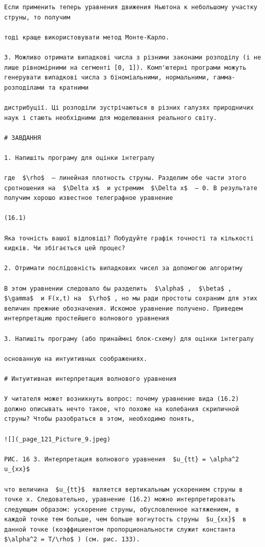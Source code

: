 \documentclass[
  ukrainian,
]{article}
\begin{document}
\begin{verbatim}
Если применить теперь уравнения движения Ньютона к небольшому участку струны, то получим

тоді краще використовувати метод Монте-Карло.

3. Можливо отримати випадкові числа з різними законами розподілу (і не лише рівномірними на сегменті [0, 1]). Комп'ютерні програми можуть генерувати випадкові числа з біноміальними, нормальними, гамма-розподілами та кратними

дистрибуції. Ці розподіли зустрічаються в різних галузях природничих наук і стають необхідними для моделювання реального світу.

# ЗАВДАННЯ

1. Напишіть програму для оцінки інтегралу

где  $\rho$  — линейная плотность струны. Разделим обе части этого сротношения на  $\Delta x$  и устремим  $\Delta x$  — 0. В результате получим хорошо известное телеграфное уравнение

(16.1)

Яка точність вашої відповіді? Побудуйте графік точності та кількості кидків. Чи збігається цей процес?

2. Отримати послідовність випадкових чисел за допомогою алгоритму

В этом уравнении следовало бы разделить  $\alpha$ ,  $\beta$ ,  $\gamma$  и F(x,t) на  $\rho$ , но мы ради простоты сохраним для этих величин прежние обозначения. Искомое уравнение получено. Приведем интерпретацию простейшего волнового уравнения

3. Напишіть програму (або принаймні блок-схему) для оцінки інтегралу

основанную на интуитивных соображениях.

# Интуитивная интерпретация волнового уравнения

У читателя может возникнуть вопрос: почему уравнение вида (16.2) должно описывать нечто такое, что похоже на колебания скрипичной струны? Чтобы разобраться в этом, необходимо понять,

![](_page_121_Picture_9.jpeg)

РИС. 16 3. Интерпретация волнового уравнения  $u_{tt} = \alpha^2 u_{xx}$ 

что величина  $u_{tt}$  является вертикальным ускорением струны в точке x. Следовательно, уравнение (16.2) можно интерпретировать следующим образом: ускорение струны, обусловленное натяжением, в каждой точке тем больше, чем больше вогнутость струны  $u_{xx}$  в данной точке (коэффициентом пропорциональности служит константа  $\alpha^2 = T/\rho$ ) (см. рис. 133).


\end{verbatim}
\end{document}
